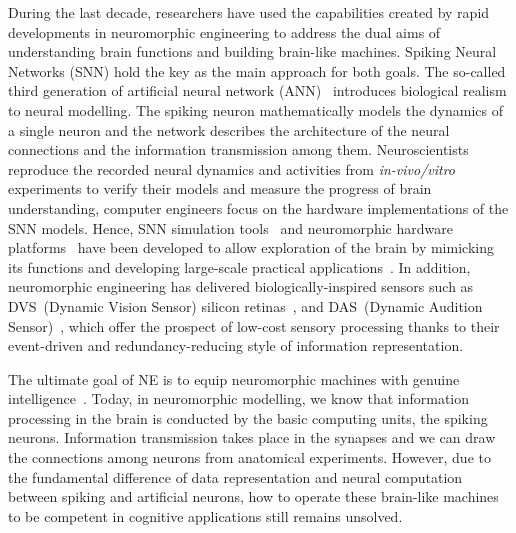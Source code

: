 

During the last decade, researchers have used the capabilities created by rapid developments in neuromorphic engineering to address the dual aims of understanding brain functions and building brain-like machines.
Spiking Neural Networks (SNN) hold the key as the main approach for both goals.
The so-called third generation of artificial neural network (ANN)~\citep{maass1997networks} introduces biological realism to neural modelling.
The spiking neuron mathematically models the dynamics of a single neuron and the network describes the architecture of the neural connections and the information transmission among them.
Neuroscientists reproduce the recorded neural dynamics and activities from \textit{in-vivo/vitro} experiments to verify their models and measure the progress of brain understanding, \DIFdelbegin {}\DIFdelend \DIFaddbegin {}\DIFaddend computer engineers focus on the hardware implementations of the SNN models.
Hence, SNN simulation tools~\citep{davison2008pynn, gewaltig2007nest, goodman2008brian} and neuromorphic hardware platforms~\citep{furber2014spinnaker,  schemmel2010wafer,benjamin2014neurogrid,merolla2014million} have been developed to allow exploration of the brain by mimicking its functions and developing large-scale practical applications~\citep{eliasmith2012large}.
In addition, neuromorphic engineering has delivered biologically-inspired sensors such as DVS~(Dynamic Vision Sensor) silicon retinas~\citep{serrano2013128, delbruck2008frame, yang2015dynamic, posch2014retinomorphic}, and DAS~(Dynamic Audition Sensor)~\citep{5537164}, which offer the prospect of low-cost sensory processing thanks to their event-driven and redundancy-reducing style of information representation.

The \DIFdelbegin {}\DIFdelend ultimate goal of NE is to equip neuromorphic machines with genuine intelligence~\citep{konar1999artificial}.
Today, in neuromorphic \DIFaddbegin {}\DIFaddend modelling, we know that information processing in the brain is conducted by the basic computing units, the spiking neurons.
Information transmission takes place in the synapses and we can draw the connections among neurons from anatomical experiments.
\DIFdelbegin {}\DIFdelend However, due to the fundamental difference of data representation and neural computation between spiking and artificial neurons, \DIFaddbegin {}\DIFaddend how to operate these brain-like machines to be competent in cognitive applications still remains unsolved.

